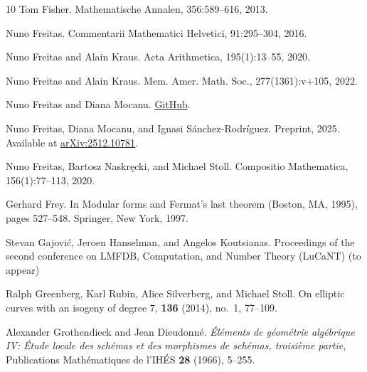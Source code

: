 \documentclass[12pt]{amsart}
\numberwithin{equation}{section}
\theoremstyle{definition}
\begin{document}
\begin{thebibliography}{10}
Tom Fisher.
\newblock Mathematische Annalen, 356:589--616, 2013.

Nuno Freitas.
\newblock Commentarii Mathematici Helvetici, 91:295--304, 2016.

Nuno Freitas and Alain Kraus.
\newblock Acta Arithmetica, 195(1):13--55, 2020.

Nuno Freitas and Alain Kraus.
\newblock Mem. Amer. Math. Soc., 277(1361):v+105, 2022.

Nuno Freitas and Diana Mocanu.
\newblock \href{https://github.com/dianamocanu97/Local-points-on-twists-of-modular-curves}{GitHub}.

Nuno Freitas, Diana Mocanu, and Ignasi S\'anchez-Rodr\'iguez.
\newblock Preprint, 2025. Available at \href{https://arxiv.org/abs/2512.10781}{arXiv:2512.10781}.

Nuno Freitas, Bartosz Naskr{\k e}cki, and Michael Stoll.
\newblock Compositio Mathematica, 156(1):77–113, 2020.

Gerhard Frey.
\newblock In Modular forms and Fermat's last theorem (Boston, MA, 1995), pages 527--548. Springer, New York, 1997.

Stevan Gajovi\'c, Jeroen Hanselman, and Angelos Koutsianas.
\newblock Proceedings of the second conference on LMFDB, Computation, and Number Theory (LuCaNT)  (to appear)

Ralph Greenberg, Karl Rubin, Alice Silverberg, and Michael Stoll.
\newblock On elliptic curves with an isogeny of degree \(7\),
 {\bf 136} (2014), no.~1, 77--109.

Alexander Grothendieck and Jean Dieudonn\'e.
\emph{\'El\'ements de g\'eom\'etrie alg\'ebrique IV:
\'Etude locale des sch\'emas et des morphismes de sch\'emas,
troisi\`eme partie},
Publications Math\'ematiques de l'IH\'ES
\textbf{28} (1966), 5--255.


\end{thebibliography}
\end{document}
